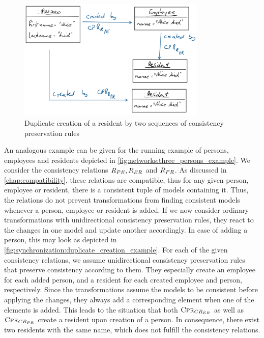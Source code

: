 \begin{figure}
    \centering
    \includegraphics[width=0.8\textwidth]{figures/correctness/synchronization/duplicate_creation_example.png}    
    \caption[Duplicate creation of an element]{Duplicate creation of a resident by two sequences of consistency preservation rules}
    \label{fig:synchronization:duplicate_creation_example}
\end{figure}

An analogous example can be given for the running example of persons, employees and residents depicted in \autoref{fig:networks:three_persons_example}.
We consider the consistency relations $R_{PE}, R_{ER}$ and $R_{PR}$.
As discussed in \autoref{chap:compatibility}, these relations are compatible, thus for any given person, employee or resident, there is a consistent tuple of models containing it.
Thus, the relations do not prevent transformations from finding consistent models whenever a person, employee or resident is added.
If we now consider ordinary transformations with unidirectional consistency preservation rules, they react to the changes in one model and update another accordingly.
In case of adding a person, this may look as depicted in \autoref{fig:synchronization:duplicate_creation_example}.
For each of the given consistency relations, we assume unidirectional consistency preservation rules that preserve consistency according to them.
They especially create an employee for each added person, and a resident for each created employee and person, respectively.
Since the transformations assume the models to be consistent before applying the changes, they always add a corresponding element when one of the elements is added.
This leads to the situation that both $\textsc{Cpr}_{CR_{ER}}$ as well as $\textsc{Cpr}_{CR_{PR}}$ create a resident upon creation of a person.
In consequence, there exist two residents with the same name, which does not fulfill the consistency relations.

